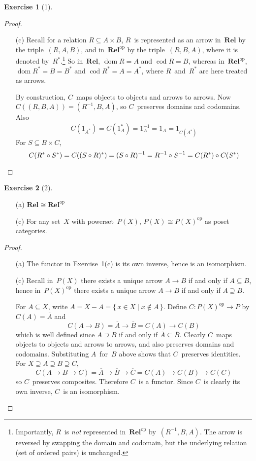 \documentclass[letterpaper,12pt]{article}
\newcommand{\Rel}{\mathbf{Rel}}
\newcommand{\iso}{\cong}
\newcommand{\after}{\circ}
\DeclareMathOperator{\dom}{dom}
\DeclareMathOperator{\cod}{cod}
\newcommand{\comp}[1]{\overline{#1}}
\newcommand{\inv}[1]{#1^{-1}}
\renewcommand{\star}[1]{#1^{*}}
\newcommand{\dual}[1]{#1^{\mathrm{op}}}
\theoremstyle{definition}
\newtheorem*{exer}{Exercise}
\theoremstyle{remark}
\theoremstyle{direction}
\begin{document}
\begin{exer}[1]
\begin{proof}
\begin{enumerate}[itemsep=0pt]
\item[(c)] Recall for a relation \(R\subseteq A\times B\), \(R\)~is represented as an arrow in~\(\Rel\) by the triple~\((R,A,B)\), and in~\(\dual{\Rel}\) by the triple~\((R,B,A)\), where it is denoted by~\(\star{R}\).\footnote{Importantly, \(R\)~is \emph{not} represented in~\(\dual{\Rel}\) by~\((\inv{R},B,A)\). The arrow is reversed by swapping the domain and codomain, but the underlying relation (set of ordered pairs) is unchanged.} So in~\(\Rel\), \(\dom R=A\) and \(\cod R=B\), whereas in~\(\dual{\Rel}\), \(\dom\star{R}=B=\star{B}\) and \(\cod\star{R}=A=\star{A}\), where \(R\)~and~\(\star{R}\) are here treated as arrows.

By construction, \(C\)~maps objects to objects and arrows to arrows. Now \(C((R,B,A))=(\inv{R},B,A)\), so \(C\)~preserves domains and codomains. Also
\[C(1_{\star{A}})=C(\star{1_A})=\inv{1_A}=1_A=1_{C(\star{A})}\]
For \(S\subseteq B\times C\),
\[C(\star{R}\after\star{S})=C(\star{(S\after R)})=\inv{(S\after R)}=\inv{R}\after\inv{S}=C(\star{R})\after C(\star{S})\qedhere\]
\end{enumerate}
\end{proof}
\end{exer}

\begin{exer}[2]\
\begin{enumerate}[itemsep=0pt]
\item[(a)] \(\Rel\iso\dual{\Rel}\)
\item[(c)] For any set~\(X\) with powerset~\(P(X)\), \(P(X)\iso\dual{P(X)}\) as poset categories.
\end{enumerate}
\begin{proof}\
\begin{enumerate}[itemsep=0pt]
\item[(a)] The functor in Exercise~1(c) is its own inverse, hence is an isomorphism.
\item[(c)] Recall in~\(P(X)\) there exists a unique arrow \(A\to B\) if and only if \(A\subseteq B\), hence in~\(\dual{P(X)}\) there exists a unique arrow \(A\to B\) if and only if \(A\supseteq B\).

For \(A\subseteq X\), write \(\comp{A}=X-A=\{\,x\in X\mid x\not\in A\,\}\). Define \(C:\dual{P(X)}\to P\) by \(C(A)=\comp{A}\) and
\[C(A\to B)=\comp{A}\to\comp{B}=C(A)\to C(B)\]
which is well defined since \(A\supseteq B\) if and only if \(\comp{A}\subseteq\comp{B}\). Clearly \(C\)~maps objects to objects and arrows to arrows, and also preserves domains and codomains. Substituting \(A\)~for~\(B\) above shows that \(C\)~preserves identities. For \(X\supseteq A\supseteq B\supseteq C\),
\[C(A\to B\to C)=\comp{A}\to\comp{B}\to\comp{C}=C(A)\to C(B)\to C(C)\]
so \(C\)~preserves composites. Therefore \(C\)~is a functor. Since \(C\)~is clearly its own inverse, \(C\)~is an isomorphism.\qedhere
\end{enumerate}
\end{proof}
\end{exer}
\end{document}
